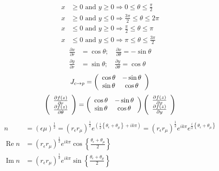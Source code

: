 \documentclass[aps,preprint]{revtex4}%
\begin{document}
\begin{align*}
x  &  \geq0\text{ and }y\geq0\Rightarrow0\leq\theta\leq\frac{\pi}{2}\\
x  &  \geq0\text{ and }y\leq0\Rightarrow\frac{3\pi}{2}\leq\theta\leq2\pi\\
x  &  \leq0\text{ and }y\geq0\Rightarrow\frac{\pi}{2}\leq\theta\leq\pi\\
x  &  \leq0\text{ and }y\leq0\Rightarrow\pi\leq\theta\leq\frac{3\pi}{2}%
\end{align*}%
\begin{align}
\frac{\partial x}{\partial r}  &  =\cos\theta;\quad\frac{\partial x}%
{\partial\theta}=-\sin\theta\\
\frac{\partial y}{\partial r}  &  =\sin\theta;\quad\frac{\partial y}%
{\partial\theta}=\cos\theta
\end{align}%
\begin{equation}
J_{c\rightarrow p}=\left(
\begin{array}
[c]{cc}%
\cos\theta & -\sin\theta\\
\sin\theta & \cos\theta
\end{array}
\right)
\end{equation}%
\begin{equation}
\left(
\begin{array}
[c]{c}%
\frac{\partial f\left(  z\right)  }{\partial r}\\
\frac{\partial f\left(  z\right)  }{\partial\theta}%
\end{array}
\right)  =\left(
\begin{array}
[c]{cc}%
\cos\theta & -\sin\theta\\
\sin\theta & \cos\theta
\end{array}
\right)  \left(
\begin{array}
[c]{c}%
\frac{\partial f\left(  z\right)  }{\partial x}\\
\frac{\partial f\left(  z\right)  }{\partial y}%
\end{array}
\right)
\end{equation}%
\begin{align}
n  &  =\left(  \epsilon\mu\right)  ^{\frac{1}{2}}=\left(  r_{\epsilon}r_{\mu
}\right)  ^{\frac{1}{2}}e^{\left(  \frac{i}{2}\left\{  \theta_{\epsilon
}+\theta_{\mu}\right\}  +ik\pi\right)  }=\left(  r_{\epsilon}r_{\mu}\right)
^{\frac{1}{2}}e^{ik\pi}e^{\frac{i}{2}\left\{  \theta_{\epsilon}+\theta_{\mu
}\right\}  }\nonumber\\
\operatorname{Re}n  &  =\left(  r_{\epsilon}r_{\mu}\right)  ^{\frac{1}{2}%
}e^{ik\pi}\cos\left\{  \frac{\theta_{\epsilon}+\theta_{\mu}}{2}\right\} \\
\operatorname{Im}n  &  =\left(  r_{\epsilon}r_{\mu}\right)  ^{\frac{1}{2}%
}e^{ik\pi}\sin\left\{  \frac{\theta_{\epsilon}+\theta_{\mu}}{2}\right\}
\nonumber
\end{align}
%
\end{document}
